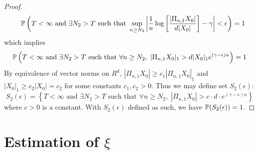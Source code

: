 \documentclass[aoas,preprint]{imsart}
\numberwithin{equation}{section}
\theoremstyle{plain}
\begin{document}
\begin{proof}
\begin{eqnarray*}
    &&
    \P \left(
      T < \infty \text{ and } \exists N_2 > T \text{ such that }
      \sup_{n \geq N_2}
      \left|
        {1 \over n} \log \left[
          {|\Pi_{n, 1} X_0| \over d |X_0|}
        \right]
        - \gamma
        \right|
        < \epsilon
    \right) = 1
  \end{eqnarray*}
  which implies
  \[
    \P \left(
      T < \infty \text{ and } \exists N_2 > T \text{ such that }
      \forall n \geq N_2,\;
      |\Pi_{n, 1} X_0|_1 > d |X_0|_1 e^{(\gamma - \epsilon) n}
    \right) = 1
  \]
  By equivalence of vector norms on $R^d$,
  $|\Pi_{n, 1} X_0| \geq c_1 | \Pi_{n, 1} X_0|_1$ and
  $|X_0|_1 \geq c_2 |X_0| = c_2$
  for some constants $c_1, c_2 > 0$. Thus we may define set
  $S_2(\epsilon)$:
  \[
  S_2(\epsilon) = \left\{
    T < \infty \text{ and } \exists N_2 > T \text{ such that }
    \forall n \geq N_2,\;
    |\Pi_{n, 1} X_0| > c \cdot d \cdot e^{(\gamma - \epsilon) n}
  \right\}
  \]
  where $c > 0$ is a constant. With $S_2(\epsilon)$ defined as such,
  we have $\P(S_2(\epsilon)) = 1$.
  
\end{proof}

\section[Estimation of xi]{Estimation of $\xi$}
\end{document}
